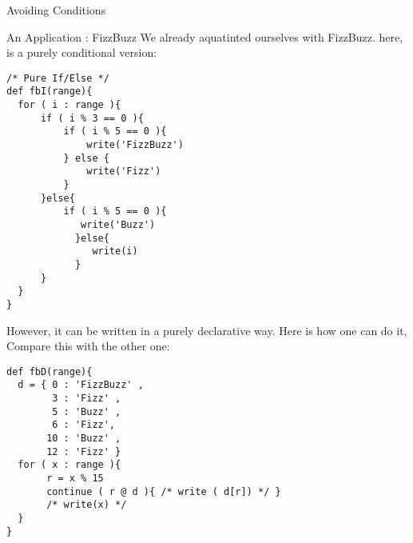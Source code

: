\begin{section}{Avoiding Conditions}
\begin{subsection}{An Application : FizzBuzz}
We already aquatinted ourselves with FizzBuzz.
here, is a purely conditional version:
\begin{lstlisting}[style=JexlStyle]
/* Pure If/Else */
def fbI(range){
  for ( i : range ){
      if ( i % 3 == 0 ){
          if ( i % 5 == 0 ){ 
              write('FizzBuzz') 
          } else {
              write('Fizz') 
          }
      }else{
          if ( i % 5 == 0 ){
             write('Buzz') 
            }else{
               write(i) 
            }
      }
  }
}
\end{lstlisting} 
However, it can be written in a purely declarative way.
Here is how one can do it, Compare this with the other one:
\begin{lstlisting}[style=JexlStyle]
def fbD(range){
  d = { 0 : 'FizzBuzz' , 
        3 : 'Fizz' , 
        5 : 'Buzz' ,  
        6 : 'Fizz', 
       10 : 'Buzz' , 
       12 : 'Fizz' }
  for ( x : range ){
       r = x % 15  
       continue ( r @ d ){ /* write ( d[r]) */ }
       /* write(x) */ 
  }
}
\end{lstlisting}

\end{subsection}

\end{section}

